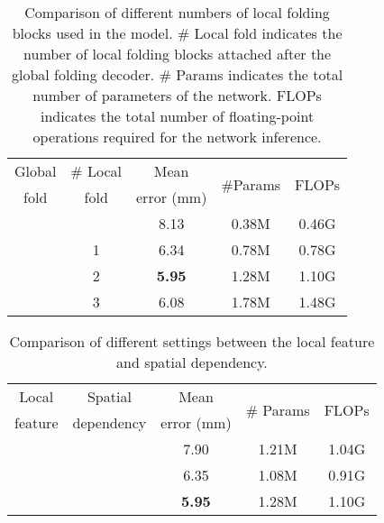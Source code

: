 \documentclass[10pt,twocolumn,letterpaper]{article}
\begin{document}
\begin{table}[h!]
\small
\begin{center}

\begin{tabular}{cc|ccc}
\hline

Global & \# Local & Mean  & \multirow{2}{*}{\#Params} &  \multirow{2}{*}{FLOPs} \\
fold & fold &  error (mm)&   &  \\
\hline


 &  &  8.13 & 0.38M & 0.46G\\
 & 1        &  6.34 & 0.78M & 0.78G\\
 & 2        &  \textbf{5.95} & 1.28M & 1.10G\\
 & 3        &  6.08 & 1.78M & 1.48G\\
\hline

\end{tabular}
\end{center}
\caption{Comparison of different numbers of local folding blocks used in the model. \# Local fold indicates the number of local folding blocks attached after the global folding decoder. \# Params indicates the total number of parameters of the network. FLOPs indicates the total number of floating-point operations required for the network inference.}
\label{tab:resfoldblock}
\end{table}


\begin{table}[h!]
\small
\begin{center}

\begin{tabular}{cc|ccc}
\hline

Local & Spatial & Mean & \multirow{2}{*}{\# Params} & \multirow{2}{*}{FLOPs}\\
feature & dependency &  error (mm) &   &  \\
\hline


 &  &  7.90 & 1.21M & 1.04G \\
 &  &  6.35 & 1.08M & 0.91G \\
 &   &  \textbf{5.95} & 1.28M & 1.10G \\
\hline

\end{tabular}
\end{center}
\caption{Comparison of different settings between the local feature and spatial dependency. 
}
\label{tab:localspatial}
\end{table}
\end{document}

